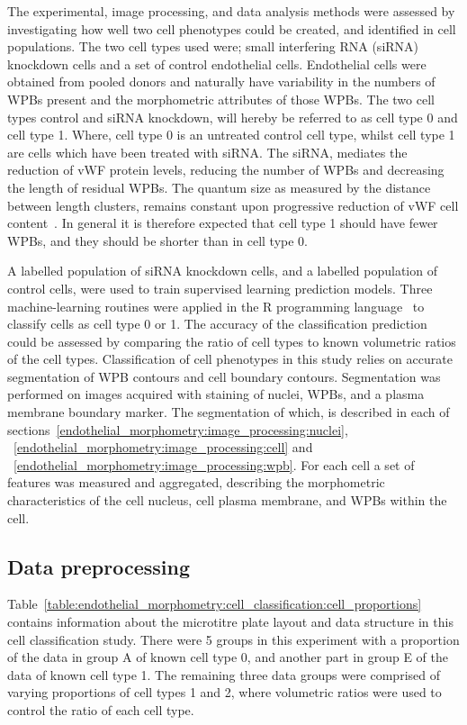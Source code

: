 The experimental, image processing, and data analysis methods were assessed by investigating how well two cell phenotypes could be created, and identified in cell populations. The two cell types used were; small interfering RNA (siRNA) knockdown cells and a set of control endothelial cells. Endothelial cells were obtained from pooled donors and naturally have variability in the numbers of WPBs present and the morphometric attributes of those WPBs. The two cell types control and siRNA knockdown, will hereby be referred to as cell type 0 and cell type 1. Where, cell type 0 is an untreated control cell type, whilst cell type 1 are cells which have been treated with siRNA. The siRNA, mediates the reduction of vWF protein levels, reducing the number of WPBs and decreasing the length of residual WPBs. The quantum size as measured by the distance between length clusters, remains constant upon progressive reduction of vWF cell content~\cite{Ferraro2014}. In general it is therefore expected that cell type 1 should have fewer WPBs, and they should be shorter than in cell type 0.

A labelled population of siRNA knockdown cells, and a labelled population of control cells, were used to train supervised learning prediction models. Three machine-learning routines were applied in the R programming language~\cite{RCoreTeam2014} to classify cells as cell type 0 or 1. The accuracy of the classification prediction could be assessed by comparing the ratio of cell types to known volumetric ratios of the cell types. Classification of cell phenotypes in this study relies on accurate segmentation of WPB contours and cell boundary contours. Segmentation was performed on images acquired with staining of nuclei, WPBs, and a plasma membrane boundary marker. The segmentation of which, is described in each of sections~\ref{endothelial_morphometry:image_processing:nuclei}, ~\ref{endothelial_morphometry:image_processing:cell} and ~\ref{endothelial_morphometry:image_processing:wpb}. For each cell a set of features was measured and aggregated, describing the morphometric characteristics of the cell nucleus, cell plasma membrane, and WPBs within the cell.

\subsection{Data preprocessing}
\label{endothelial_morphometry:cell_classification:data_preprocessing}
Table~\ref{table:endothelial_morphometry:cell_classification:cell_proportions} contains information about the microtitre plate layout and data structure in this cell classification study. There were 5 groups in this experiment with a proportion of the data in group A of known cell type 0, and another part in group E of the data of known cell type 1. The remaining three data groups were comprised of varying proportions of cell types 1 and 2, where volumetric ratios were used to control the ratio of each cell type.

